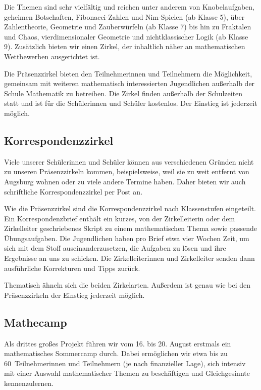 \documentclass[12pt]{zettel}
\begin{document}
Die Themen sind sehr vielfältig und reichen unter anderem von
Knobelaufgaben, geheimen Botschaften, Fibonacci-Zahlen und Nim-Spielen (ab Klasse 5),
über Zahlentheorie, Geometrie und Zauberwürfeln (ab Klasse 7) bis hin zu
Fraktalen und Chaos, vierdimensionaler Geometrie und nichtklassischer Logik
(ab Klasse 9). Zusätzlich bieten wir einen Zirkel, der inhaltlich näher an
mathematischen Wettbewerben ausgerichtet ist.

Die Präsenzzirkel bieten den Teilnehmerinnen und Teilnehmern die Möglichkeit,
gemeinsam mit weiteren mathematisch interessierten Jugendlichen außerhalb der
Schule Mathematik zu betreiben. Die Zirkel finden außerhalb der Schulzeiten
statt und ist für die Schülerinnen und Schüler kostenlos. Der Einstieg ist
jederzeit möglich.


\subsection{Korrespondenzzirkel}

Viele unserer Schülerinnen und Schüler können aus verschiedenen Gründen
nicht zu unseren Präsenzzirkeln kommen, beispielsweise, weil sie zu weit
entfernt von Augsburg wohnen oder zu viele andere Termine haben.
Daher bieten wir auch schriftliche Korrespondenzzirkel per Post
an.

Wie die Präsenzzirkel sind die Korrespondenzzirkel nach Klassenstufen eingeteilt. Ein
Korrespondenzbrief enthält ein kurzes, von der Zirkelleiterin oder dem
Zirkelleiter geschriebenes Skript zu einem mathematischen Thema sowie passende
Übungsaufgaben. Die Jugendlichen haben pro Brief etwa vier Wochen Zeit, um sich
mit dem Stoff auseinanderzusetzen, die Aufgaben zu lösen und ihre Ergebnisse
an uns zu schicken. Die Zirkelleiterinnen und Zirkelleiter senden dann
ausführliche Korrekturen und Tipps zurück.

Thematisch ähneln sich die beiden Zirkelarten. Außerdem ist genau wie bei den
Präsenzzirkeln der Einstieg jederzeit möglich.


\subsection{Mathecamp}

Als drittes großes Projekt führen wir vom 16. bis 20. August erstmals ein
mathematisches Sommercamp durch. Dabei ermöglichen wir etwa bis zu 60~Teilnehmerinnen
und Teilnehmern (je nach finanzieller Lage), sich intensiv mit einer Auswahl mathematischer Themen zu
beschäftigen und Gleichgesinnte kennenzulernen.
\end{document}
